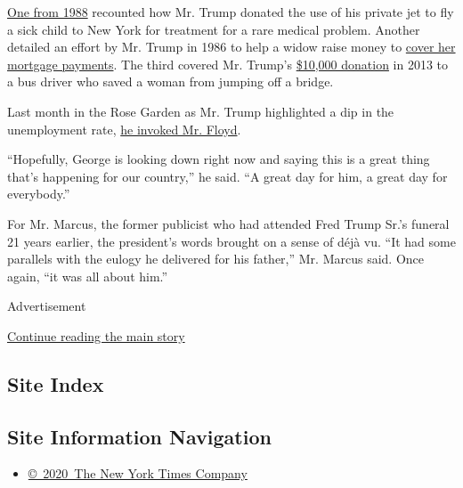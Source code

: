 \href{https://www.jta.org/1988/07/20/archive/orthodox-child-with-rare-ailment-is-rescued-aboard-tycoons-jet}{One
from 1988} recounted how Mr. Trump donated the use of his private jet to
fly a sick child to New York for treatment for a rare medical problem.
Another detailed an effort by Mr. Trump in 1986 to help a widow raise
money to
\href{https://apnews.com/24c831825e0dab47d51d8d25bffe45f5}{cover her
mortgage payments}. The third covered Mr. Trump's
\href{https://www.aol.com/2013/11/08/trump-gift-barton-buffalo/}{\$10,000
donation} in 2013 to a bus driver who saved a woman from jumping off a
bridge.

Last month in the Rose Garden as Mr. Trump highlighted a dip in the
unemployment rate,
\href{https://www.nytimes.com/2020/06/05/us/politics/trump-jobs-report-george-floyd.html}{he
invoked Mr. Floyd}.

``Hopefully, George is looking down right now and saying this is a great
thing that's happening for our country,'' he said. ``A great day for
him, a great day for everybody.''

For Mr. Marcus, the former publicist who had attended Fred Trump Sr.'s
funeral 21 years earlier, the president's words brought on a sense of
déjà vu. ``It had some parallels with the eulogy he delivered for his
father,'' Mr. Marcus said. Once again, ``it was all about him.''

Advertisement

\protect\hyperlink{after-bottom}{Continue reading the main story}

\hypertarget{site-index}{%
\subsection{Site Index}\label{site-index}}

\hypertarget{site-information-navigation}{%
\subsection{Site Information
Navigation}\label{site-information-navigation}}

\begin{itemize}
\tightlist
\item
  \href{https://help.nytimes.com/hc/en-us/articles/115014792127-Copyright-notice}{©~2020~The
  New York Times Company}
\end{itemize}

